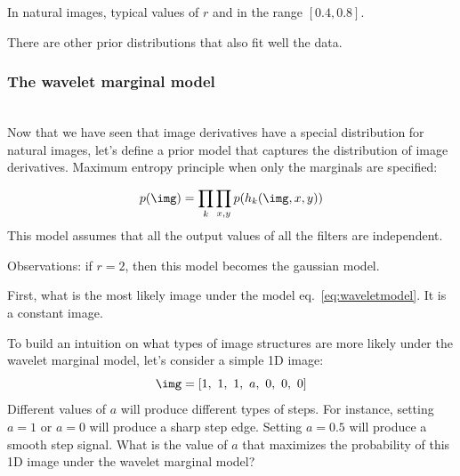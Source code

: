
In natural images, typical values of $r$ and in the range $\left[0.4, 0.8\right]$.



There are other prior distributions that also fit well the data.



\subsubsection{The wavelet marginal model}
~\\

Now that we have seen that image derivatives have a special distribution for natural images, let's define a prior model that captures the distribution of image derivatives. Maximum entropy principle when only the marginals are specified:

\begin{equation}
  p(\img) = \prod_{k} \prod_{x,y} p(h_k(\img, x,y))
  \label{eq:waveletmodel}
\end{equation}
This model assumes that all the output values of all the filters are independent.

Observations: if $r = 2$, then this model becomes the gaussian model.


%
%
%

First, what is the most likely image under the model eq.~\ref{eq:waveletmodel}. It is a constant image.


To build an intuition on what types of image structures are more likely under the wavelet marginal model, let's consider a simple 1D image:
\begin{equation}
  \img = \left[1,~ 1,~ 1,~ a,~ 0,~ 0,~ 0\right]
\end{equation}
Different values of $a$ will produce different types of steps. For instance, setting $a=1$ or $a=0$ will produce a sharp step edge. Setting $a=0.5$ will produce a smooth step signal. What is the value of $a$ that maximizes the probability of this 1D image under the wavelet marginal model?

